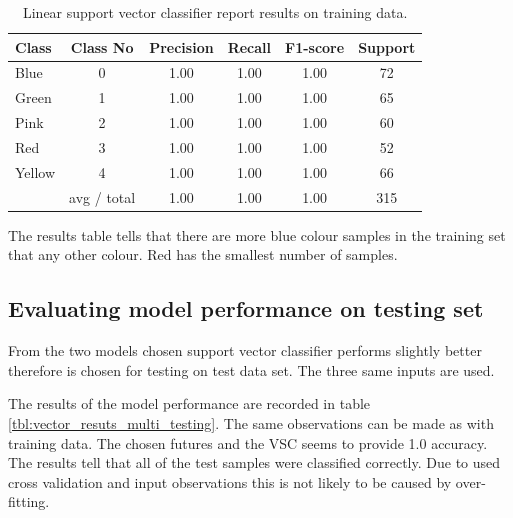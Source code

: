 \documentclass[11pt]{article}
\begin{document}
			\begin{center}
			  	\begin{table}[h]
			  	\centering
				\begin{tabular}[b]{| l | c | c | c | c | c |}
					\hline
					Class & Class No & Precision &  Recall & F1-score & Support  \\
		 			\hline
					Blue & 0  &   1.00   &   1.00   &   1.00   &   72 \\
          			Green & 1  &   1.00   &   1.00   &   1.00   &    65 \\
         			Pink & 2  &   1.00   &   1.00   &   1.00   &     60 \\
          			Red & 3  &   1.00   &   1.00   &   1.00   &     52 \\
          			Yellow & 4  &   1.00   &   1.00   &   1.00   &     66 \\
          			\hline
					 & avg / total   &   1.00   &   1.00   &   1.00  &      315 \\
					\hline
				\end{tabular}
				\caption{Linear support vector classifier report results on training data.}
				\label{tbl:vector_resuts_multi}
				\end{table}
			\end{center}
			\vspace*{-1.3cm}

 			 The results table tells that there are more blue colour samples in the training set that any other colour. Red has the smallest number of samples.  

		\subsection{Evaluating model performance on testing set}

			From the two models chosen support vector classifier performs slightly better therefore is chosen for testing on test data set. The three same inputs are used.

			The results of the model performance are recorded in table \ref{tbl:vector_resuts_multi_testing}. The same observations can be made as with training data. The chosen futures and the VSC seems to provide 1.0 accuracy. The results tell that all of the test samples were classified correctly. Due to used cross validation and input observations this is not likely to be caused by over-fitting. 
\end{document}
